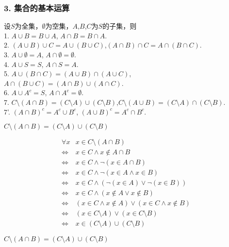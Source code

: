 \documentclass{beamer}
\begin{document}
\begin{CJK*}{UTF8}{gbsn}
\begin{frame}
  \frametitle{3. 集合的基本运算}
  \begin{Thm3.1}
设$S$为全集，$\emptyset$为空集，$A$,$B$,$C$为$S$的子集，则\\
1. $A \cup B = B \cup A$, $A \cap B = B \cap A$.\\
2. $(A \cup B) \cup C = A \cup (B \cup C)$,$(A \cap B) \cap C = A \cap (B \cap C)$.\\
3. $A \cup \emptyset = A$, $A \cap \emptyset = \emptyset$.\\
4. $A \cup S = S$, $A \cap S = A$.\\
5. $A \cup (B \cap C) = (A \cup B) \cap (A \cup C)$, $A \cap (B \cup C) = (A \cap B) \cup (A \cap C)$.\\
6. $A \cup A^c = S$, $A \cap A^c = \emptyset$.\\
7. $C \setminus (A \cap B) = (C \setminus A) \cup (C \setminus B)$,$C\setminus (A \cup B) = (C \setminus A) \cap (C \setminus B)$.\\ 
7'. $(A \cap B)^c = A^c \cup B^c$, $(A \cup B)^c = A^c \cap B^c$.\\
  \end{Thm3.1}
\end{frame}

\begin{frame}
  $C \setminus (A \cap B) = (C \setminus A) \cup (C \setminus B)$

  \begin{equation*}
    \begin{split}
      \forall x &x \in C\setminus (A\cap B)\\
      \Leftrightarrow&x \in C \land x \notin A\cap B\\
      \Leftrightarrow&x \in C \land \lnot (x \in A\cap B)\\
      \Leftrightarrow&x \in C \land \lnot (x \in A \land x \in B)\\
      \Leftrightarrow&x \in C \land (\lnot (x \in A) \lor \lnot (x \in B))\\
      \Leftrightarrow&x \in C \land (x \notin A \lor x \notin B)\\
      \Leftrightarrow&(x \in C \land x \notin A) \lor (x \in C \land x \notin B)\\
      \Leftrightarrow&(x \in C\setminus A)\lor (x\in C\setminus B)\\
      \Leftrightarrow&x \in (C\setminus A) \cup (C \setminus B)
    \end{split}
  \end{equation*}
\end{frame}
\begin{frame}
  $C \setminus (A \cap B) = (C \setminus A) \cup (C \setminus B)$


\end{frame}
\end{CJK*}
\end{document}
